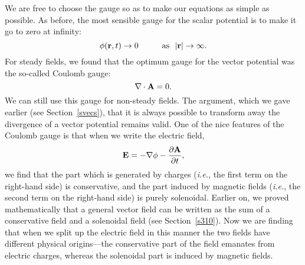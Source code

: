 We are free to choose the gauge so as to make our equations as simple
as possible. As before, the most sensible gauge for the scalar potential is
to make it go to zero at infinity:
\begin{equation}
\phi({\bf r},t) \rightarrow 0\mbox{\hspace{1cm}as~~$|{\bf r}|\rightarrow \infty$}.
\end{equation}
For steady fields, we found that
the optimum gauge for the vector potential
was the so-called Coulomb gauge:
\begin{equation}
\nabla\cdot {\bf A} = 0.
\end{equation}
We can still use this gauge for non-steady fields. The argument, which we gave
earlier (see Section~\ref{svecs}), that it is always possible to transform away the
divergence of a vector potential remains valid. One of the nice features of
the Coulomb gauge is that when we write the electric field,
\begin{equation}\label{e4.21}
{\bf E} = -\nabla\phi - \frac{\partial {\bf A}}{\partial t},
\end{equation}
we find that the part which is generated by charges ({\em i.e.}, the first term on the
right-hand side) is conservative, and the part induced by magnetic fields
({\em i.e.}, the second term on the right-hand side) is purely solenoidal. Earlier on, we
proved mathematically that a general vector field can be written as the sum
of a conservative field and a solenoidal field (see Section~\ref{s310}). Now we
are finding that when we split up the electric field in this manner the
two fields have different physical origins---the conservative part of
the field emanates from
electric charges, whereas the solenoidal part is induced by magnetic fields. 


